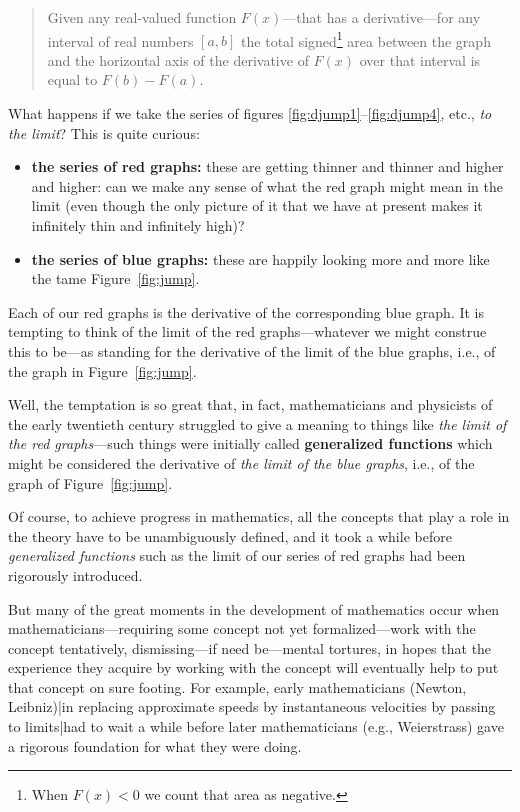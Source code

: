 \documentclass[openany]{book}
\theoremstyle{plain}
\theoremstyle{definition}
\begin{document}
{\begin{quote} Given any real-valued function $F(x)$---that has a
  derivative---for any interval of real numbers $[a,b]$ the total
  signed\footnote{When $F(x)<0$ we count that area as negative.} area
  between the graph and the horizontal axis
  of the derivative of $F(x)$ over that interval is
  equal to $F(b)-F(a)$.
  \end{quote}
    What happens if we take the series of figures \ref{fig:djump1}--\ref{fig:djump4}, etc.,
    {\it to the limit}?  This is quite curious:

  \begin{itemize}
  \item {\bf the series of red graphs:} these are getting thinner and
    thinner and higher and higher: can we make any sense of what the
    red graph might mean in the limit (even though the only picture of
    it that we have at present makes it infinitely thin and infinitely
    high)?

  \item {\bf the series of blue graphs:} these are happily looking
    more and more like the tame Figure~\ref{fig:jump}.
   \end{itemize}

   Each of our red graphs is the derivative of the corresponding blue
   graph. It is tempting to think of the limit of the red
   graphs---whatever we might construe this to be---as standing for
   the derivative of the limit of the blue graphs, i.e., of the graph
   in Figure~\ref{fig:jump}.

   Well, the temptation is so great that, in fact, mathematicians and
   physicists of the early twentieth century struggled to give a
   meaning to things like {\it the limit of the red graphs}---such
   things were initially called {\bf generalized functions} which
   might be considered the derivative of {\it the limit of the blue
     graphs}, i.e., of the graph of Figure~\ref{fig:jump}.


   Of course, to achieve progress in mathematics, all the concepts
   that play a role in the theory have to be unambiguously defined,
   and it took a while before {\it generalized functions} such as the
   limit of our series of red graphs had been rigorously introduced.

   But many of the great moments in the development of mathematics
   occur when mathematicians---requiring some concept not yet
   formalized---work with the concept tentatively, dismissing---if
   need be---mental tortures, in hopes that the experience they
   acquire by working with the concept will eventually help to put
   that concept on sure footing. For example, early mathematicians
   (Newton, Leibniz)|in replacing approximate speeds by instantaneous
   velocities by passing to limits|had to wait a while before later
   mathematicians (e.g., Weierstrass) gave a rigorous foundation for
   what they were doing.


}
\end{document}
